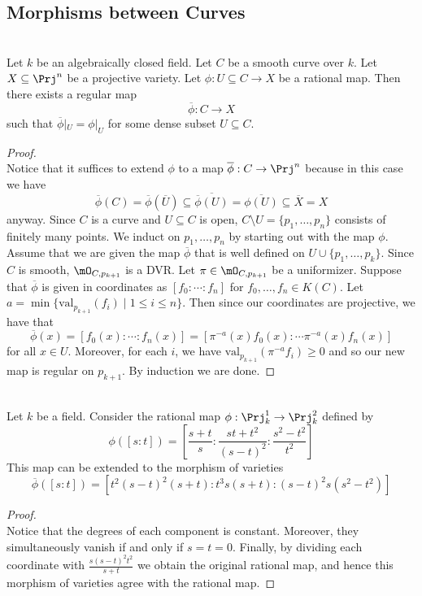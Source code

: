 \documentclass[a4paper]{article}
\begin{document}
\subsection{Morphisms between Curves}
\begin{prp}{}{}\\
Let $k$ be an algebraically closed field. Let $C$ be a smooth curve over $k$. Let $X\subseteq\Prj^n$ be a projective variety. Let $\phi:U\subseteq C\to X$ be a rational map. Then there exists a regular map $$\overline{\phi}:C\to X$$ such that $\overline{\phi}|_U=\phi|_U$ for some dense subset $U\subseteq C$. 
\begin{proof}\\
Notice that it suffices to extend $\phi$ to a map $\overline{\phi}:C\to\Prj^n$ because in this case we have $$\overline{\phi}(C)=\overline{\phi}(\overline{U})\subseteq\overline{\overline{\phi}(U)}=\overline{\phi(U)}\subseteq\overline{X}=X$$ anyway. Since $C$ is a curve and $U\subseteq C$ is open, $C\setminus U=\{p_1,\dots,p_n\}$ consists of finitely many points. We induct on $p_1,\dots,p_n$ by starting out with the map $\phi$. \\

Assume that we are given the map $\overline{\phi}$ that is well defined on $U\cup\{p_1,\dots,p_k\}$. Since $C$ is smooth, $\mO_{C,p_{k+1}}$ is a DVR. Let $\pi\in\mO_{C,p_{k+1}}$ be a uniformizer. Suppose that $\overline{\phi}$ is given in coordinates as $[f_0:\cdots:f_n]$ for $f_0,\dots,f_n\in K(C)$. Let $a=\min\{\text{val}_{p_{k+1}}(f_i)\;|\;1\leq i\leq n\}$. Then since our coordinates are projective, we have that $$\overline{\phi}(x)=[f_0(x):\cdots:f_n(x)]=[\pi^{-a}(x)f_0(x):\cdots\pi^{-a}(x)f_n(x)]$$ for all $x\in U$. Moreover, for each $i$, we have $\text{val}_{p_{k+1}}(\pi^{-a}f_i)\geq 0$ and so our new map is regular on $p_{k+1}$. By induction we are done. 
\end{proof}
\end{prp}

\begin{eg}{}{}\\
Let $k$ be a field. Consider the rational map $\phi:\Prj_k^1\to\Prj_k^2$ defined by $$\phi([s:t])=\left[\frac{s+t}{s}:\frac{st+t^2}{(s-t)^2}:\frac{s^2-t^2}{t^2}\right]$$ This map can be extended to the morphism of varieties $$\overline{\phi}([s:t])=[t^2(s-t)^2(s+t):t^3s(s+t):(s-t)^2s(s^2-t^2)]$$
\begin{proof}\\
Notice that the degrees of each component is constant. Moreover, they simultaneously vanish if and only if $s=t=0$. Finally, by dividing each coordinate with $\frac{s(s-t)^2t^2}{s+t}$ we obtain the original rational map, and hence this morphism of varieties agree with the rational map. 
\end{proof}
\end{eg}
\end{document}
